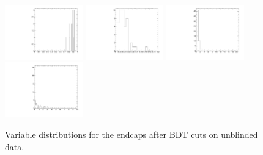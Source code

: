 \begin{figure}
  \includegraphics[width=0.3\textwidth]{Figures/AfterBDTCut_iso_EndcapsUnblinded.pdf}
  \includegraphics[width=0.3\textwidth]{Figures/AfterBDTCut_docatrk_EndcapsUnblinded.pdf}
  \includegraphics[width=0.3\textwidth]{Figures/AfterBDTCut_closetrk_EndcapsUnblinded.pdf}
  \includegraphics[width=0.3\textwidth]{Figures/AfterBDTCut_chi2dof_EndcapsUnblinded.pdf}
  \caption{Variable distributions for the endcaps after BDT cuts on unblinded data.}
  \label{fig:massPlotUnblinded}
\end{figure}


